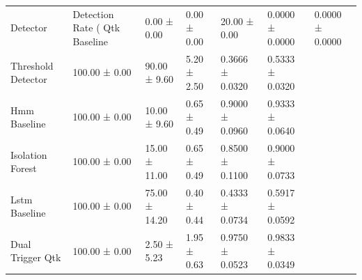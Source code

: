 \begin{tabular}{llllll}
\toprule
Detector & Detection Rate (%
\midrule
Qtk Baseline & 0.00 ± 0.00 & 0.00 ± 0.00 & 20.00 ± 0.00 & 0.0000 ± 0.0000 & 0.0000 ± 0.0000 \\
Threshold Detector & 100.00 ± 0.00 & 90.00 ± 9.60 & 5.20 ± 2.50 & 0.3666 ± 0.0320 & 0.5333 ± 0.0320 \\
Hmm Baseline & 100.00 ± 0.00 & 10.00 ± 9.60 & 0.65 ± 0.49 & 0.9000 ± 0.0960 & 0.9333 ± 0.0640 \\
Isolation Forest & 100.00 ± 0.00 & 15.00 ± 11.00 & 0.65 ± 0.49 & 0.8500 ± 0.1100 & 0.9000 ± 0.0733 \\
Lstm Baseline & 100.00 ± 0.00 & 75.00 ± 14.20 & 0.40 ± 0.44 & 0.4333 ± 0.0734 & 0.5917 ± 0.0592 \\
Dual Trigger Qtk & 100.00 ± 0.00 & 2.50 ± 5.23 & 1.95 ± 0.63 & 0.9750 ± 0.0523 & 0.9833 ± 0.0349 \\
\bottomrule
\end{tabular}
